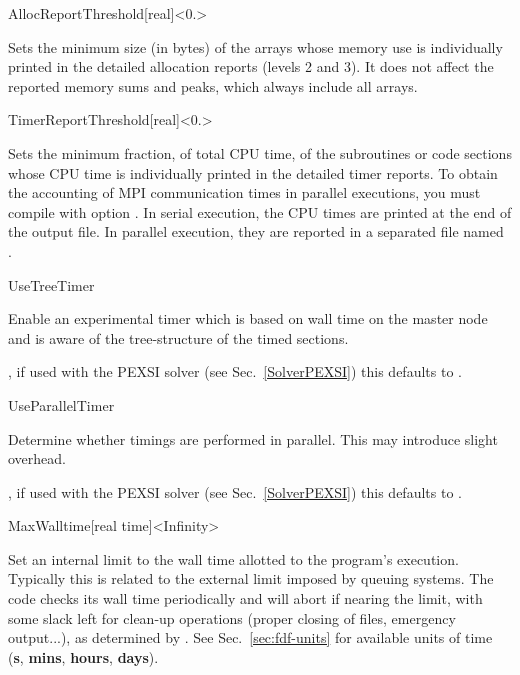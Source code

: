 \begin{fdfentry}{AllocReportThreshold}[real]<$0.$>

Sets the minimum size (in bytes) of the arrays whose memory use is
individually printed in the detailed allocation reports (levels 2 and
3). It does not affect the reported memory sums and peaks, which
always include all arrays.
  
\end{fdfentry}

\begin{fdfentry}{TimerReportThreshold}[real]<$0.$>

  Sets the minimum fraction, of total CPU time, of the subroutines or
  code sections whose CPU time is individually printed in the detailed
  timer reports. To obtain the accounting of MPI communication times
  in parallel executions, you must compile with option
  .
  In serial execution, the CPU times are printed at the end of the
  output file. In parallel execution, they are reported in a separated
  file named .
  
\end{fdfentry}

\begin{fdflogicalF}{UseTreeTimer}

  Enable an experimental timer which is based on wall time on the
  master node and is aware of the tree-structure of the timed
  sections.

  \note, if used with the PEXSI solver (see Sec.~\ref{SolverPEXSI})
  this defaults to \fdftrue.
  
\end{fdflogicalF}


\begin{fdflogicalT}{UseParallelTimer}

  Determine whether timings are performed in parallel. This may
  introduce slight overhead.

  \note, if used with the PEXSI solver (see Sec.~\ref{SolverPEXSI})
  this defaults to \fdffalse.
  
\end{fdflogicalT}

\begin{fdfentry}{MaxWalltime}[real time]<Infinity>

  Set an internal limit to the wall time allotted to the
  program's execution. Typically this is related to the external limit
  imposed by queuing systems. The code checks its wall time periodically
  and will abort if nearing the limit, with some slack left for clean-up
  operations (proper closing of files, emergency output...), as determined
  by . See Sec.~\ref{sec:fdf-units} for available
  units of time (\textbf{s}, \textbf{mins}, \textbf{hours}, \textbf{days}).

\end{fdfentry}


